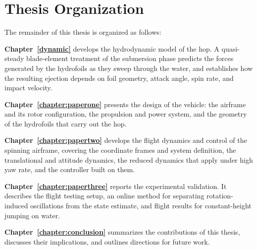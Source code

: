 \section{Thesis Organization}

The remainder of this thesis is organized as follows:

\textbf{Chapter~\ref{dynamic}} develops the hydrodynamic model of the hop.  A
quasi-steady blade-element treatment of the submersion phase predicts the
forces generated by the hydrofoils as they sweep through the water, and
establishes how the resulting ejection depends on foil geometry, attack angle,
spin rate, and impact velocity.

\textbf{Chapter~\ref{chapter:paperone}} presents the design of the vehicle: the
airframe and its rotor configuration, the propulsion and power system, and the
geometry of the hydrofoils that carry out the hop.

\textbf{Chapter~\ref{chapter:papertwo}} develops the flight dynamics and
control of the spinning airframe, covering the coordinate frames and system
definition, the translational and attitude dynamics, the reduced dynamics that
apply under high yaw rate, and the controller built on them.

\textbf{Chapter~\ref{chapter:paperthree}} reports the experimental validation.
It describes the flight testing setup, an online method for separating
rotation-induced oscillations from the state estimate, and flight results for
constant-height jumping on water.

\textbf{Chapter~\ref{chapter:conclusion}} summarizes the contributions of this
thesis, discusses their implications, and outlines directions for future work.
